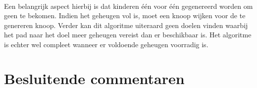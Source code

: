 \paragraph{}Een belangrijk aspect hierbij is dat kinderen \'e\'en voor \'e\'en gegenereerd worden om geen  te bekomen. Indien het geheugen vol is, moet een knoop wijken voor de te genereren knoop. Verder kan dit algoritme uiteraard geen doelen vinden waarbij het pad naar het doel meer geheugen vereist dan er beschikbaar is. Het algoritme is echter wel compleet wanneer er voldoende geheugen voorradig is.%
\section{Besluitende commentaren}
